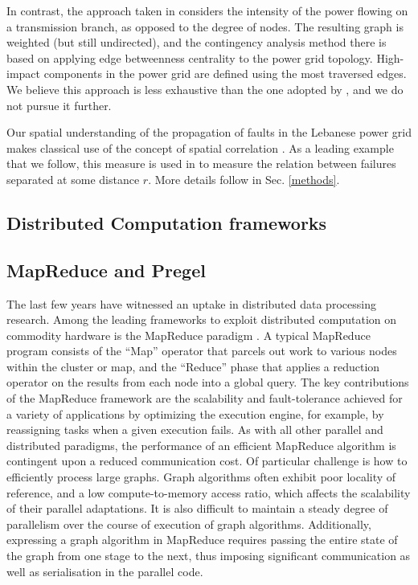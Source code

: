 In contrast, the approach taken in \cite{JinAl10} considers the intensity of the power flowing on a transmission branch, as opposed to the degree of nodes. The resulting graph is weighted (but still undirected), and the contingency analysis method there is based on applying edge betweenness centrality \cite{GirvanAl02} to the power grid topology. High-impact components in the power grid are defined using the most traversed edges. We believe this approach is less exhaustive than the one adopted by \cite{2000Natur.406..378A}, and we do not pursue it further.

Our spatial understanding of the propagation of faults in the Lebanese power grid makes classical use of the concept of spatial correlation \cite{CavagnaAl10, MakseAl95}. As a leading example that we follow, this measure is used in \cite{DaqingAl14} to measure the relation between failures separated at some distance $r$. More details follow in Sec. \ref{methods}.


\subsection{Distributed Computation frameworks}
\label{distcomp}

\subsection{MapReduce and Pregel}

The last few years have witnessed an uptake in distributed data processing research. Among the leading frameworks to exploit distributed computation on commodity hardware is the MapReduce paradigm \cite{mapreduce}. A typical MapReduce program consists of the ``Map'' operator that parcels out work to various nodes within the cluster or map, and the ``Reduce'' phase that applies a reduction operator on the results from each node into a global query. The key contributions of the MapReduce framework are the scalability and fault-tolerance achieved for a variety of applications by optimizing the execution engine, for example, by reassigning tasks when a given execution fails. As with all other parallel and distributed paradigms, the performance of an efficient MapReduce algorithm is contingent upon a reduced communication cost. Of particular challenge is how to efficiently process large graphs. Graph algorithms often exhibit poor locality of reference, and a low compute-to-memory access ratio, which affects the scalability of their parallel adaptations. It is also difficult to maintain a steady degree of parallelism over the course of execution of graph algorithms. Additionally, expressing a graph algorithm in MapReduce requires passing the entire state of the graph from one stage to the next, thus imposing significant communication as well as serialisation in the parallel code. 

